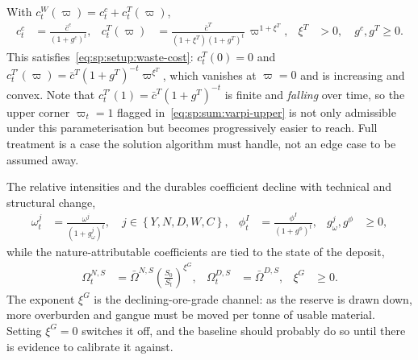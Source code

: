  With $c^W_t\left(\varpi\right)=c^c_t+c^T_t\left(\varpi\right)$,
\begin{align}
c^c_t &= \frac{\bar c^c}{\left(1+g^c\right)^t},
&
c^T_t\!\left(\varpi\right) &= \frac{\bar c^T}{\left(1+\xi^T\right)\left(1+g^T\right)^t}\,\varpi^{1+\xi^T},
&
\xi^T&>0,\quad g^c,g^T\ge0 .
\label{eq:qsp:waste-costs}
\end{align}
This satisfies~\eqref{eq:sp:setup:waste-cost}: $c^T_t\left(0\right)=0$ and
$c^{T\prime}_t\left(\varpi\right)=\bar c^T\left(1+g^T\right)^{-t}\varpi^{\xi^T}$, which vanishes at
$\varpi=0$ and is increasing and convex. Note that
$c^{T\prime}_t\left(1\right)=\bar c^T\left(1+g^T\right)^{-t}$ is finite and \emph{falling} over time, so
the upper corner $\varpi_t=1$ flagged in~\eqref{eq:sp:sum:varpi-upper} is not only admissible under
this parameterisation but becomes progressively easier to reach. Full treatment is a case the solution
algorithm must handle, not an edge case to be assumed away.

 The relative intensities and the durables coefficient decline with
technical and structural change,
\begin{align}
\omega^j_t &= \frac{\omega^j}{\left(1+g^j_\omega\right)^t},
\quad j\in\left\{Y,N,D,W,C\right\},
&
\phi^I_t &= \frac{\phi^I}{\left(1+g^\phi\right)^t},
&
g^j_\omega,g^\phi&\ge0 ,
\label{eq:qsp:intensities}
\end{align}
while the nature-attributable coefficients are tied to the state of the deposit,
\begin{align}
\Omega^{N,S}_t &= \bar\Omega^{N,S}\left(\frac{S_0}{S_t}\right)^{\xi^{G}},
&
\Omega^{D,S}_t &= \bar\Omega^{D,S},
&
\xi^{G}&\ge0 .
\label{eq:qsp:nature-intensities}
\end{align}
The exponent $\xi^G$ is the declining-ore-grade channel: as the reserve is drawn down, more overburden
and gangue must be moved per tonne of usable material. Setting $\xi^G=0$ switches it off, and the
baseline should probably do so until there is evidence to calibrate it against.

